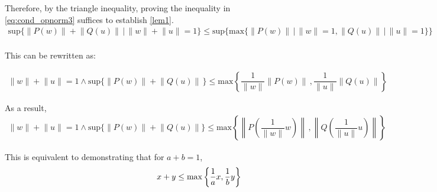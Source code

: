 Therefore, by the triangle inequality, proving the inequality in \autoref{eq:cond_opnorm3} suffices to establish  \autoref{lem1}.
\begin{equation} \label{eq:cond_opnorm3}
  \begin{split}
  \text{sup}{\{ \lVert P (w)  \rVert + \lVert Q (u)  \rVert  \hspace{2pt} |  \hspace{2pt}  \lVert w \rVert+ \lVert u \rVert=1  \}} \leq \text{sup} \{  \text{max} \{ \lVert P (w) \rVert  \hspace{2pt} |  \hspace{2pt}  \lVert w  \rVert =1, \lVert Q (u) \rVert  \hspace{2pt} |  \hspace{2pt}  \lVert u \rVert=1  \} \} \\
  \end{split}
\end{equation}


This can be rewritten as:

\begin{equation} 
  \begin{split}
    \lVert w \rVert+ \lVert u \rVert=1 \wedge \text{sup} \{ \lVert P (w)  \rVert + \lVert Q (u)  \rVert  \hspace{2pt}   \}  \leq \text{max}   \left\{ \dfrac{1}{\lVert w \rVert} \lVert P (w) \rVert  \hspace{2pt},  \dfrac{1}{\lVert u \rVert} \lVert Q (u) \rVert   \right\}
\end{split}
\end{equation}

As a result,
\begin{equation} 
  \begin{split}
    \lVert w \rVert+ \lVert u \rVert=1 \wedge \text{sup}{\{ \lVert P (w)  \rVert + \lVert Q (u)  \rVert    \}}  \leq \text{max}   \left\{  \left\lVert P \left( \dfrac{1}{\lVert w \rVert} w \right) \right\rVert  \hspace{2pt},  \left\lVert Q \left( \dfrac{1}{\lVert u \rVert} u \right) \right\rVert   \right\}
\end{split}
\end{equation}

This is equivalent to demonstrating that for $a+b=1$,
\begin{equation} 
\begin{split}
\hspace{110 pt}
    x + y  \leq  \max \left\{   \dfrac{1}{a}x  ,   \dfrac{1}{b} y   \right\} \\
\end{split}
\end{equation}

